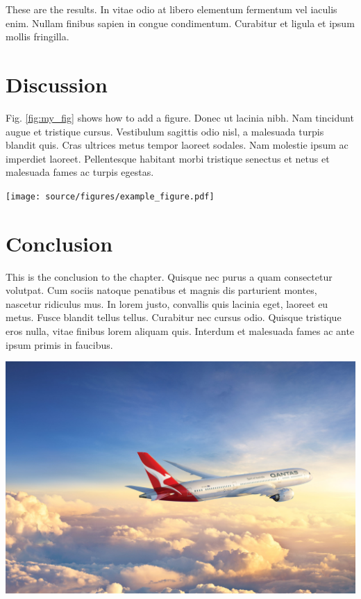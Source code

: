 \documentclass[12pt,a4paper,]{report}
\let\origfigure=\figure
\let\endorigfigure=\endfigure
\renewenvironment{figure}[1][]{%
\origfigure[b]
}{%
\endorigfigure
}
\begin{document}
These are the results. In vitae odio at libero elementum fermentum vel
iaculis enim. Nullam finibus sapien in congue condimentum. Curabitur et
ligula et ipsum mollis fringilla.

\hypertarget{discussion-1}{%
\section{Discussion}\label{discussion-1}}

Fig. \ref{fig:my_fig} shows how to add a figure. Donec ut lacinia nibh.
Nam tincidunt augue et tristique cursus. Vestibulum sagittis odio nisl,
a malesuada turpis blandit quis. Cras ultrices metus tempor laoreet
sodales. Nam molestie ipsum ac imperdiet laoreet. Pellentesque habitant
morbi tristique senectus et netus et malesuada fames ac turpis egestas.

\begin{figure}[htbp]
\centering
\texttt{[image: source/figures/example\_figure.pdf]}
\caption[It's a boat]{RV Calypso is a former British Royal Navy minesweeper converted into a research vessel for the oceanographic researcher Jacques-Yves Cousteau. It was equipped with a mobile laboratory for underwater field research.}\label{fig:my_fig}
\end{figure}

\hypertarget{conclusion-2}{%
\section{Conclusion}\label{conclusion-2}}

This is the conclusion to the chapter. Quisque nec purus a quam
consectetur volutpat. Cum sociis natoque penatibus et magnis dis
parturient montes, nascetur ridiculus mus. In lorem justo, convallis
quis lacinia eget, laoreet eu metus. Fusce blandit tellus tellus.
Curabitur nec cursus odio. Quisque tristique eros nulla, vitae finibus
lorem aliquam quis. Interdum et malesuada fames ac ante ipsum primis in
faucibus.

\begin{figure}
\hypertarget{fig:other_fig}{%
\centering
\includegraphics[width=1\textwidth,height=\textheight]{source/figures/full_caption_example.jpg}
\caption{This is not a boat}\label{fig:other_fig}
}
\end{figure}
\end{document}
